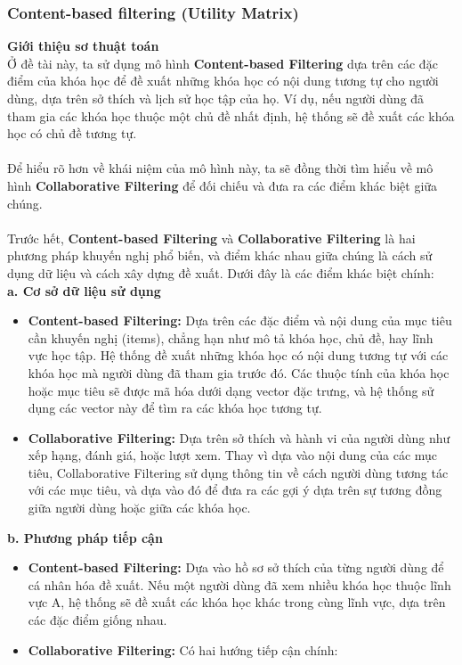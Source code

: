 \subsubsection{Content-based filtering (Utility Matrix)}
\textbf{Giới thiệu sơ thuật toán}\\
Ở đề tài này, ta sử dụng mô hình \textbf{Content-based Filtering} dựa trên các đặc điểm của khóa học để đề xuất những khóa học có nội dung tương tự cho người dùng, dựa trên sở thích và lịch sử học tập của họ. Ví dụ, nếu người dùng đã tham gia các khóa học thuộc một chủ đề nhất định, hệ thống sẽ đề xuất các khóa học có chủ đề tương tự.\\
\\
Để hiểu rõ hơn về khái niệm của mô hình này, ta sẽ đồng thời tìm hiểu về mô hình \textbf{Collaborative Filtering} để đối chiếu và đưa ra các điểm khác biệt giữa chúng.\\
\\
Trước hết,  \textbf{Content-based Filtering} và \textbf{Collaborative Filtering} là hai phương pháp khuyến nghị phổ biến, và điểm khác nhau giữa chúng là cách sử dụng dữ liệu và cách xây dựng đề xuất. Dưới đây là các điểm khác biệt chính:\\
\textbf{a. Cơ sở dữ liệu sử dụng}
\begin{itemize}
    \item \textbf{Content-based Filtering:} Dựa trên các đặc điểm và nội dung của mục tiêu cần khuyến nghị (items), chẳng hạn như mô tả khóa học, chủ đề, hay lĩnh vực học tập. Hệ thống đề xuất những khóa học có nội dung tương tự với các khóa học mà người dùng đã tham gia trước đó. Các thuộc tính của khóa học hoặc mục tiêu sẽ được mã hóa dưới dạng vector đặc trưng, và hệ thống sử dụng các vector này để tìm ra các khóa học tương tự.
    \item \textbf{Collaborative Filtering:} Dựa trên sở thích và hành vi của người dùng như xếp hạng, đánh giá, hoặc lượt xem. Thay vì dựa vào nội dung của các mục tiêu, Collaborative Filtering sử dụng thông tin về cách người dùng tương tác với các mục tiêu, và dựa vào đó để đưa ra các gợi ý dựa trên sự tương đồng giữa người dùng hoặc giữa các khóa học.
\end{itemize}
\textbf{b. Phương pháp tiếp cận}
\begin{itemize}
    \item \textbf{Content-based Filtering:} Dựa vào hồ sơ sở thích của từng người dùng để cá nhân hóa đề xuất. Nếu một người dùng đã xem nhiều khóa học thuộc lĩnh vực A, hệ thống sẽ đề xuất các khóa học khác trong cùng lĩnh vực, dựa trên các đặc điểm giống nhau.
    \item \textbf{Collaborative Filtering:} Có hai hướng tiếp cận chính:
\end{itemize}
